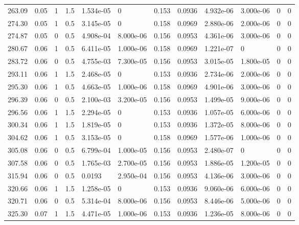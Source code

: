 \documentclass[preview]{standalone}
\begin{document}
{{{\begin{tabular}{L{1.2cm}C{1.2cm} C{0.3cm}C{0.5cm} C{1.4cm}C{1.4cm} C{1.4cm}C{1.4cm} C{1.6cm}C{1.6cm} C{1.6cm}C{1.6cm}}
  263.09  &  0.05  & 1     & 1.5 &  1.534e-05  & 0  &  0.153&   0.0936& 4.932e-06 & 3.000e-06   &  0 & 0  \\ 
  274.30  &  0.05  & 1     & 0.5 &  3.145e-05  & 0  &  0.158&   0.0969& 2.880e-06 & 2.000e-06   &  0 & 0  \\ 
  274.87  &  0.05  & 0     & 0.5 &  4.908e-04  & 8.000e-06  &  0.156&   0.0953& 4.361e-06 & 3.000e-06   &  0 & 0  \\ 
  280.67  &  0.06  & 1     & 0.5 &  6.411e-05  & 1.000e-06  &  0.158&   0.0969& 1.221e-07 & 0   &  0 & 0  \\ 
  283.72  &  0.06  & 0     & 0.5 &  4.755e-03  & 7.300e-05  &  0.156&   0.0953& 3.015e-05 & 1.800e-05   &  0 & 0  \\ 
  293.11  &  0.06  & 1     & 1.5 &  2.468e-05  & 0  &  0.153&   0.0936& 2.734e-06 & 2.000e-06   &  0 & 0  \\ 
  295.30  &  0.06  & 1     & 0.5 &  4.663e-05  & 1.000e-06  &  0.158&   0.0969& 4.901e-06 & 3.000e-06   &  0 & 0  \\ 
  296.39  &  0.06  & 0     & 0.5 &  2.100e-03  & 3.200e-05  &  0.156&   0.0953& 1.499e-05 & 9.000e-06   &  0 & 0  \\ 
  296.56  &  0.06  & 1     & 1.5 &  2.294e-05  & 0  &  0.153&   0.0936& 1.057e-05 & 6.000e-06   &  0 & 0  \\ 
  300.34  &  0.06  & 1     & 1.5 &  1.819e-05  & 0  &  0.153&   0.0936& 1.372e-05 & 8.000e-06   &  0 & 0  \\ 
  304.62  &  0.06  & 1     & 0.5 &  3.153e-05  & 0  &  0.158&   0.0969& 1.577e-06 & 1.000e-06   &  0 & 0  \\ 
  305.08  &  0.06  & 0     & 0.5 &  6.799e-04  & 1.000e-05  &  0.156&   0.0953& 2.480e-07 & 0   &  0 & 0  \\ 
  307.58  &  0.06  & 0     & 0.5 &  1.765e-03  & 2.700e-05  &  0.156&   0.0953& 1.886e-05 & 1.200e-05   &  0 & 0  \\ 
  315.94  &  0.06  & 0     & 0.5 &  0.0193  & 2.950e-04  &  0.156&   0.0953& 4.136e-06 & 3.000e-06   &  0 & 0  \\ 
  320.66  &  0.06  & 1     & 1.5 &  1.258e-05  & 0  &  0.153&   0.0936& 9.060e-06 & 6.000e-06   &  0 & 0  \\ 
  320.71  &  0.06  & 0     & 0.5 &  5.314e-04  & 8.000e-06  &  0.156&   0.0953& 8.446e-06 & 5.000e-06   &  0 & 0  \\ 
  325.30  &  0.07  & 1     & 1.5 &  4.471e-05  & 1.000e-06  &  0.153&   0.0936& 1.236e-05 & 8.000e-06   &  0 & 0  \\ 

\end{tabular}}}}
\end{document}
